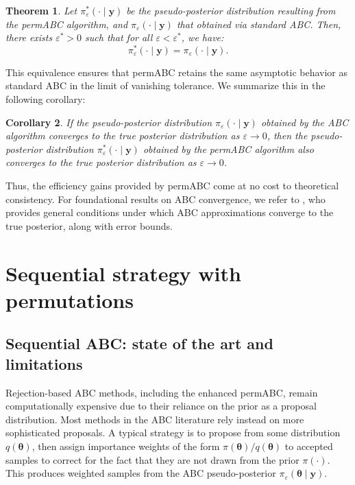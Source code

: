 \documentclass[11pt,a4paper]{article}
\def\obsdata{\mathbf{y}}
\def\param{\boldsymbol{\theta}}
\theoremstyle{plain}
\newtheorem{theorem}{Theorem}[section]
\newtheorem{corollary}[theorem]{Corollary}
\theoremstyle{definition}
\theoremstyle{remark}
\begin{document}
\begin{theorem}
\label{th:permABC_star}
Let $\pi^*_{\varepsilon}( \cdot \mid \obsdata)$ be the pseudo-posterior distribution resulting from the permABC algorithm, and $\pi_{\varepsilon}( \cdot \mid \obsdata)$ that obtained via standard ABC. Then, there exists $\varepsilon^*>0$ such that for all $\varepsilon < \varepsilon^*$, we have:
\[
\pi^*_{\varepsilon}( \cdot \mid \obsdata) = \pi_{\varepsilon}( \cdot \mid \obsdata).
\]
\end{theorem}

This equivalence ensures that permABC retains the same asymptotic behavior as standard ABC in the limit of vanishing tolerance. We summarize this in the following corollary:

\begin{corollary}
\label{col:permabc}
If the pseudo-posterior distribution $\pi_{\varepsilon}(\cdot \mid \obsdata)$ obtained by the ABC algorithm converges to the true posterior distribution as $\varepsilon \to 0$, then the pseudo-posterior distribution $\pi_{\varepsilon}^*(\cdot \mid \obsdata)$ obtained by the permABC algorithm also converges to the true posterior distribution as $\varepsilon \to 0$.
\end{corollary}

Thus, the efficiency gains provided by permABC come at no cost to theoretical consistency. For foundational results on ABC convergence, we refer to \citet{fearnhead2018abc}, who provides general conditions under which ABC approximations converge to the true posterior, along with error bounds.

\section{Sequential strategy with permutations}
\label{sec:sequential}

\subsection{Sequential ABC: state of the art and limitations}
\label{sec:abc_smc}

Rejection-based ABC methods, including the enhanced permABC, remain computationally expensive due to their reliance on the prior as a proposal distribution. 
Most methods in the ABC literature rely instead on more sophisticated proposals. A typical strategy is to propose from some distribution \( q(\param) \), then assign importance weights  of the form \( \pi(\param)/q(\param) \) to accepted samples to correct for the fact that they are not drawn from the prior \( \pi(\cdot) \). This produces weighted samples from the ABC pseudo-posterior \( \pi_\varepsilon(\param \mid \obsdata) \). 
\end{document}
